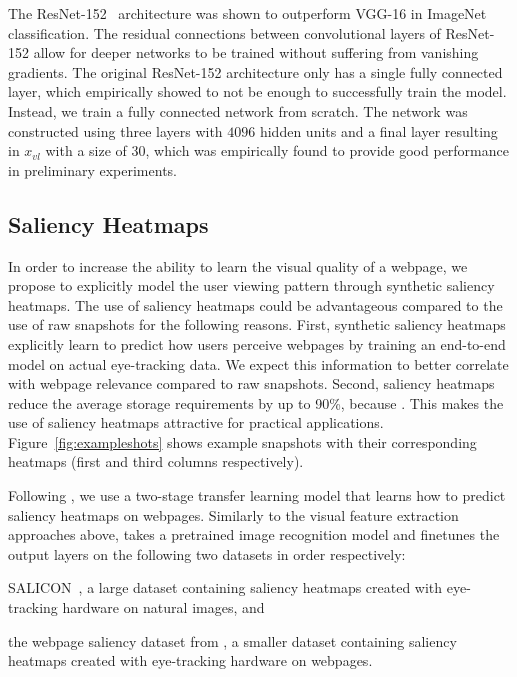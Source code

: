 The ResNet-152~\cite{he2016deep} architecture was shown to outperform VGG-16 in ImageNet classification.
The residual connections between convolutional layers of ResNet-152 allow for deeper networks to be trained without suffering from vanishing gradients.
The original ResNet-152 architecture only has a single fully connected layer, which empirically showed to not be enough to successfully train the model.
Instead, we train a fully connected network from scratch.
The network was constructed using three layers with $4096$ hidden units and a final layer resulting in $x_{vl}$ with a size of $30$, which was empirically found to provide good performance in preliminary experiments.


\subsection{Saliency Heatmaps} \label{sec:saliency}
In order to increase the ability to learn the visual quality of a webpage, we propose to explicitly model the user viewing pattern through synthetic saliency heatmaps.
The use of saliency heatmaps could be advantageous compared to the use of raw snapshots for the following reasons.
First, synthetic saliency heatmaps explicitly learn to predict how users perceive webpages by training an end-to-end model on actual eye-tracking data.
We expect this information to better correlate with webpage relevance compared to raw snapshots.
Second, saliency heatmaps reduce the average storage requirements by up to 90\%, because .
This makes the use of saliency heatmaps attractive for practical applications.
Figure~\ref{fig:exampleshots} shows example snapshots with their corresponding heatmaps (first and third columns respectively).

Following \cite{shan2017two}, we use a two-stage transfer learning model that learns how to predict saliency heatmaps on webpages.
Similarly to the visual feature extraction approaches above, \cite{shan2017two} takes a pretrained image recognition model and finetunes the output layers on the following two datasets in order respectively:
\begin{inparaenum}[(i)]
\item SALICON~\cite{jiang2015salicon}, a large dataset containing saliency heatmaps created with eye-tracking hardware on natural images, and 
\item the webpage saliency dataset from \cite{shen2014webpage}, a smaller dataset containing saliency heatmaps created with eye-tracking hardware on webpages.
\end{inparaenum}

